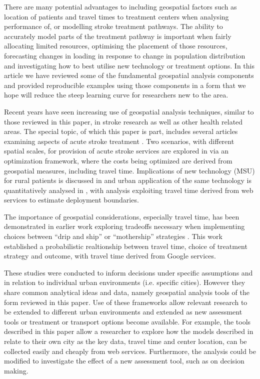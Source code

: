 \documentclass[utf8]{frontiersHLTH}
\begin{document}
There are many potential advantages to including geospatial factors
such as location of patients and travel times to treatment centers
when analysing performance of, or modelling stroke treatment
pathways. The ability to accurately model parts of the treatment
pathway is important when fairly allocating limited resources,
optimising the placement of those resources, forecasting changes in
loading in response to change in population distribution and
investigating how to best utilise new technology or treatment
options. In this article we have reviewed some of the fundamental
geospatial analysis components and provided reproducible examples
using those components in a form that we hope will reduce the steep
learning curve for researchers new to the area.

Recent years have seen increasing use of geospatial analysis
techniques, similar to those reviewed in this paper, in stroke
research as well as other health related areas. The special topic, of
which this paper is part, includes several articles examining aspects
of acute stroke treatment \cite{10.3389/fneur.2019.00150,
  10.3389/fneur.2019.00159, 10.3389/fneur.2019.00331}.  Two scenarios,
with different spatial scales, for provision of acute stroke services
are explored in \cite{10.3389/fneur.2019.00150} via an optimization
framework, where the costs being optimized are derived from geospatial
measures, including travel time. Implications of new technology (MSU)
for rural patients is discussed in \cite{10.3389/fneur.2019.00159} and
urban application of the same technology is quantitatively analysed in
\cite{10.3389/fneur.2019.00331}, with analysis exploiting travel time
derived from web services to estimate deployment boundaries.

The importance of geospatial considerations, especially travel time,
has been demonstrated in earlier work exploring tradeoffs necessary
when implementing choices between ``drip and ship'' or ``mothership''
strategies \cite{10.1001/jamaneurol.2018.2424,Milne_2017}. This work
established a probabilistic realtionship between travel time, choice
of treatment strategy and outcome, with travel time derived from
Google services.

These studies were conducted to inform decisions under specific
assumptions and in relation to individual urban environments
(i.e. specific cities). However they share common analytical ideas and
data, namely geospatial analysis tools of the form reviewed in this
paper. Use of these frameworks allow relevant research to be extended
to different urban environments and extended as new assessment tools
or treatment or transport options become available. For example, the
tools described in this paper allow a researcher to explore how the
models described in \cite{10.1001/jamaneurol.2018.2424,Milne_2017}
relate to their own city as the key data, travel time and center
location, can be collected easily and cheaply from web
services. Furthermore, the analysis could be modified to investigate
the effect of a new assessment tool, such as
\cite{10.3389/fneur.2019.00130} on decision making.
\end{document}
